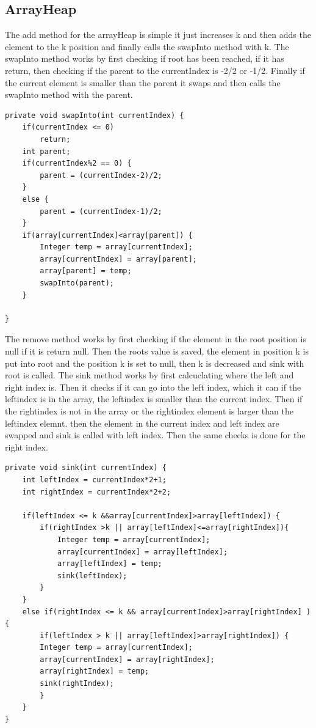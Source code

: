 \documentclass[a4paper,11pt]{article}
\begin{document}
\subsection*{ArrayHeap}
The add method for the arrayHeap is simple it just increases k and then adds the element to the k position and finally calls the swapInto method with k. 
The swapInto method works by first checking if root has been reached, if it has return, then checking if the parent to the currentIndex is -2/2 or -1/2. Finally if the current element is 
smaller than the parent it swaps and then calls the swapInto method with the parent. 
\begin{verbatim}
private void swapInto(int currentIndex) {
    if(currentIndex <= 0)
        return;
    int parent;
    if(currentIndex%2 == 0) {
        parent = (currentIndex-2)/2;
    }
    else {
        parent = (currentIndex-1)/2;
    }
    if(array[currentIndex]<array[parent]) {
        Integer temp = array[currentIndex];
        array[currentIndex] = array[parent];
        array[parent] = temp;
        swapInto(parent);
    }
    
}
\end{verbatim}
The remove method works by first checking if the element in the root position is null if it is return null. Then the roots value is saved, the element in position k is put into root and the position k is set to null, then k is decreased and sink with root is called.
The sink method works by first calcuclating where the left and right index is. Then it checks if it can go into the left index, which it can if the leftindex is in the array, the leftindex is smaller than the current index. Then if the rightindex is not in the array or the rightindex element is larger than the leftindex elemnt. then the element in the current index and left index are swapped and sink is called with left index.
Then the same checks is done for the right index.
\begin{verbatim}
private void sink(int currentIndex) {
    int leftIndex = currentIndex*2+1;
    int rightIndex = currentIndex*2+2;

    if(leftIndex <= k &&array[currentIndex]>array[leftIndex]) {
        if(rightIndex >k || array[leftIndex]<=array[rightIndex]){
            Integer temp = array[currentIndex];
            array[currentIndex] = array[leftIndex];
            array[leftIndex] = temp;
            sink(leftIndex);
        }
    }
    else if(rightIndex <= k && array[currentIndex]>array[rightIndex] ) {
        if(leftIndex > k || array[leftIndex]>array[rightIndex]) {
        Integer temp = array[currentIndex];
        array[currentIndex] = array[rightIndex];
        array[rightIndex] = temp;
        sink(rightIndex);  
        }
    }
}
\end{verbatim}
\end{document}
